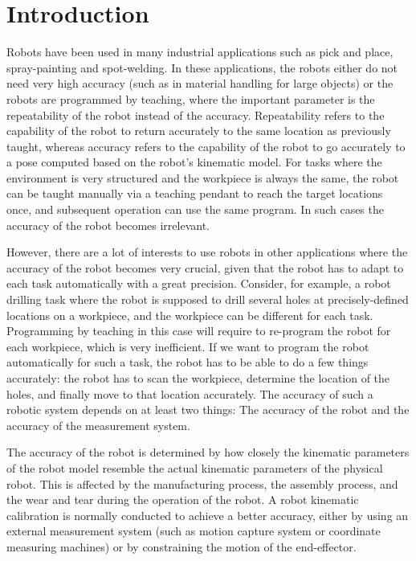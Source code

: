 \section{Introduction}
\label{sec:introduction}

Robots have been used in many industrial applications such as pick and place, spray-painting and spot-welding. In these applications, the robots either do not need very high accuracy (such as in material handling for large objects) or the robots are programmed by teaching, where the important parameter is the repeatability of the robot instead of the accuracy. Repeatability refers to the capability of the robot to return accurately to the same location as previously taught, whereas accuracy refers to the capability of the robot to go accurately to a pose computed based on the robot's kinematic model. For tasks where the environment is very structured and the workpiece is always the same, the robot can be taught manually via a teaching pendant to reach the target locations once, and subsequent operation can use the same program. In such cases the accuracy of the robot becomes irrelevant. 

However, there are a lot of interests to use robots in other applications where the accuracy of the robot becomes very crucial, given that the robot has to adapt to each task automatically with a great precision. Consider, for example, a robot drilling task where the robot is supposed to drill several holes at precisely-defined locations on a workpiece, and the workpiece can be different for each task. Programming by teaching in this case will require to re-program the robot for each workpiece, which is very inefficient. If we want to program the robot automatically for such a task, the robot has to be able to do a few things accurately: the robot has to scan the workpiece, determine the location of the holes, and finally
move to that location accurately. The accuracy of such a robotic system depends on at least two things: The accuracy of the robot and the accuracy of the measurement system. 

The accuracy of the robot is determined by how closely the kinematic parameters of the robot model resemble the actual kinematic parameters of the physical robot. This is affected by the manufacturing process, the assembly process, and the wear and tear during the operation of the robot. A robot kinematic calibration is normally conducted to achieve a better accuracy, either by using an external measurement system (such as motion capture system or coordinate measuring machines) or by constraining the motion of the end-effector.

